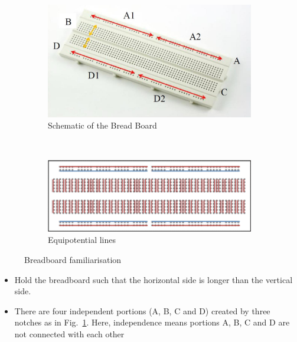 \documentclass[9pt]{scrreprt}
\begin{document}
\begin{figure}[H]
    \centering
    \begin{subfigure}[b]{0.57\textwidth}
        \centering
        \includegraphics[width=\linewidth]{logos/Breadboard.png}
        \caption{Schematic of the Bread Board}
        \label{fig:Breadboard}
    \end{subfigure}
    \\
    \begin{subfigure}[b]{0.43\textwidth}
        \centering
        \includegraphics[width=\textwidth]{logos/Breadboard_connections.png}
        \caption{Equipotential lines}
        \label{fig:Breadboard_connections}
    \end{subfigure}
    \caption{Breadboard familiarisation}
    \label{fig:Breadboard familiarisation}
\end{figure}

\begin{itemize}
\item Hold the breadboard such that the horizontal side is longer than the vertical side.
\item There are four independent portions (A, B, C and D) created by three notches as in Fig.~\ref{fig:Breadboard}. Here, independence means portions A, B, C and D are not connected with each other
\end{itemize}
\end{document}
